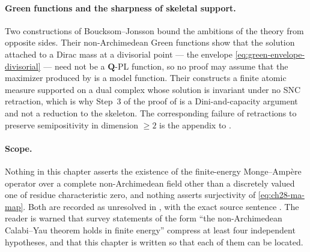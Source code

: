 \paragraph{Green functions and the sharpness of skeletal support.}
Two constructions of Boucksom--Jonsson bound the ambitions of the theory
from opposite sides.  Their non-Archimedean Green functions
\cite[Theorem~A]{BJGreen24} show that the solution attached to a Dirac mass
at a divisorial point --- the envelope
\eqref{eq:green-envelope-divisorial} --- need not be a $\mathbf Q$-PL
function, so no proof may assume that the maximizer produced by
 is a model function.  Their
\cite[Theorem~B]{BJGreen24} constructs a finite atomic measure supported on a
dual complex whose solution is invariant under no SNC retraction, which is
why Step~3 of the proof of  is a Dini-and-capacity
argument and not a reduction to the skeleton.  The corresponding failure of
retractions to preserve semipositivity in dimension $\geq2$ is the appendix
to \cite{GJKM19}.

\paragraph{Scope.}
Nothing in this chapter asserts the existence of the finite-energy
Monge--Amp\`ere operator over a complete non-Archimedean field other than a
discretely valued one of residue characteristic zero, and nothing asserts
surjectivity of \eqref{eq:ch28-ma-map}.  Both are recorded as unresolved in
, with the exact source sentence
\cite[Remark~4.4]{PS23Hybrid}.  The reader is warned that survey statements
of the form ``the non-Archimedean Calabi--Yau theorem holds in finite
energy'' compress at least four independent hypotheses, and that this chapter
is written so that each of them can be located.
